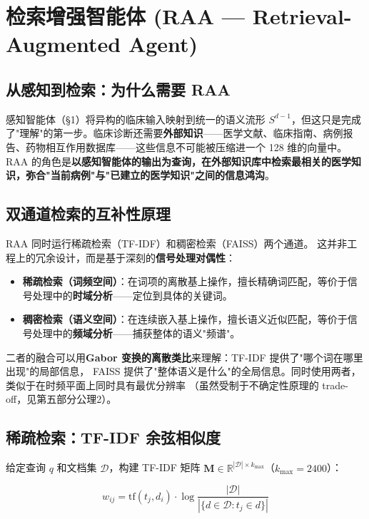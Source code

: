 \documentclass[11pt,a4paper]{ctexart}
\theoremstyle{remark}
\begin{document}
\section{检索增强智能体 (RAA — Retrieval-Augmented Agent)}

\subsection{从感知到检索：为什么需要 RAA}

感知智能体（§1）将异构的临床输入映射到统一的语义流形 $S^{d-1}$，但这只是完成了"理解"的第一步。临床诊断还需要\textbf{外部知识}——医学文献、临床指南、病例报告、药物相互作用数据库——这些信息不可能被压缩进一个 128 维的向量中。RAA 的角色是\textbf{以感知智能体的输出为查询，在外部知识库中检索最相关的医学知识，弥合"当前病例"与"已建立的医学知识"之间的信息鸿沟}。

\subsection{双通道检索的互补性原理}

RAA 同时运行稀疏检索（TF-IDF）和稠密检索（FAISS）两个通道。
这并非工程上的冗余设计，而是基于深刻的\textbf{信号处理对偶性}：

\begin{itemize}[nosep]
\item \textbf{稀疏检索（词频空间）}：在词项的离散基上操作，擅长精确词匹配，等价于信号处理中的\textbf{时域分析}——定位到具体的关键词。
\item \textbf{稠密检索（语义空间）}：在连续嵌入基上操作，擅长语义近似匹配，等价于信号处理中的\textbf{频域分析}——捕获整体的语义"频谱"。
\end{itemize}

二者的融合可以用\textbf{Gabor 变换的离散类比}来理解：TF-IDF 提供了"哪个词在哪里出现"的局部信息，
FAISS 提供了"整体语义是什么"的全局信息。同时使用两者，类似于在时频平面上同时具有最优分辨率
（虽然受制于不确定性原理的 trade-off，见第五部分公理2）。

\subsection{稀疏检索：TF-IDF 余弦相似度}

给定查询 $q$ 和文档集 $\mathcal{D}$，构建 TF-IDF 矩阵 $\mathbf{M} \in \mathbb{R}^{|\mathcal{D}| \times k_{\max}}$（$k_{\max}=2400$）：

\begin{equation}
w_{ij} = \text{tf}(t_j, d_i) \cdot \log\frac{|\mathcal{D}|}{|\{d \in \mathcal{D}: t_j \in d\}|}
\end{equation}
\end{document}
